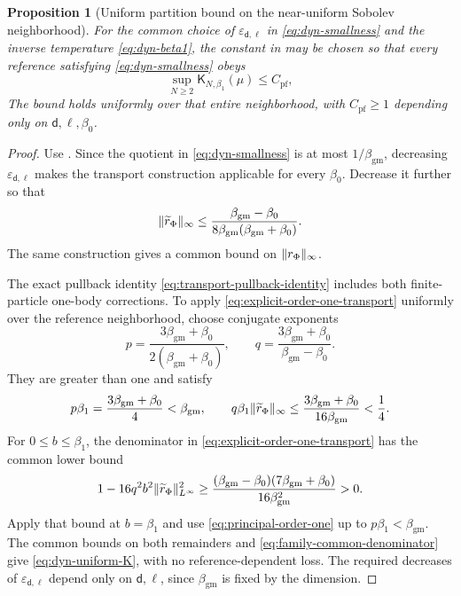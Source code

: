 \documentclass[11pt,reqno]{amsart}
\numberwithin{equation}{section}
\theoremstyle{plain}
\newtheorem{prop}[prop]{Proposition}
\theoremstyle{definition}
\DeclarePairedDelimiter{\norm}{\lVert}{\rVert}
\renewcommand{\d}{\mathsf d}
\newcommand{\be}{\beta}
\newcommand{\vep}{\varepsilon}
\newcommand{\K}{\mathsf K}
\newcommand{\tl}{\widetilde}
\newcommand{\gm}{\mathrm{gm}}
\begin{document}
\begin{prop}[Uniform partition bound on the near-uniform Sobolev neighborhood]
\label{prop:family-uniform-partition}
For the common choice of $\vep_{\d,\ell}$ in \eqref{eq:dyn-smallness} and the inverse temperature \eqref{eq:dyn-beta1}, the constant in  may be chosen so that every reference satisfying \eqref{eq:dyn-smallness} obeys
\begin{equation}
 \sup_{N\geq2}\K_{N,\be_1}(\mu)\leq C_{\mathrm{pf}},
 \label{eq:dyn-uniform-K}
\end{equation}
The bound holds uniformly over that entire neighborhood, with $C_{\mathrm{pf}}\geq1$ depending only on $\d,\ell,\be_0$.
\end{prop}
\begin{proof}
Use . Since the quotient in \eqref{eq:dyn-smallness} is at most $1/\beta_{\gm}$, decreasing $\vep_{\d,\ell}$ makes the transport construction applicable for every $\be_0$. Decrease it further so that
\begin{equation}
 \norm{\tl r_\Phi}_\infty
 \leq\frac{\beta_{\gm}-\be_0}{8\beta_{\gm}(\beta_{\gm}+\be_0)}.
 \label{eq:dyn-r-tube}
\end{equation}
The same construction gives a common bound on $\norm{r_\Phi}_\infty$.

The exact pullback identity \eqref{eq:transport-pullback-identity} includes both finite-particle one-body corrections. To apply \eqref{eq:explicit-order-one-transport} uniformly over the reference neighborhood, choose conjugate exponents
\begin{equation}
 p=\frac{3\beta_{\gm}+\be_0}{2(\beta_{\gm}+\be_0)},\qquad
 q=\frac{3\beta_{\gm}+\be_0}{\beta_{\gm}-\be_0}.
 \label{eq:dyn-pq}
\end{equation}
They are greater than one and satisfy
\begin{equation}
 p\be_1=\frac{3\beta_{\gm}+\be_0}4<\beta_{\gm},\qquad
 q\be_1\norm{\tl r_\Phi}_\infty
 \leq\frac{3\beta_{\gm}+\be_0}{16\beta_{\gm}}<\frac14.
 \label{eq:dyn-common-margin}
\end{equation}
For $0\leq b\leq\be_1$, the denominator in \eqref{eq:explicit-order-one-transport} has the common lower bound
\begin{equation}
 1-16q^2b^2\norm{\tl r_{\Phi}}_{L^\infty}^2
 \geq\frac{(\beta_{\gm}-\be_0)(7\beta_{\gm}+\be_0)}{16\beta_{\gm}^2}>0.
 \label{eq:family-common-denominator}
\end{equation}
Apply that bound at $b=\be_1$ and use \eqref{eq:principal-order-one} up to $p\be_1<\beta_{\gm}$. The common bounds on both remainders and \eqref{eq:family-common-denominator} give \eqref{eq:dyn-uniform-K}, with no reference-dependent loss. The required decreases of $\vep_{\d,\ell}$ depend only on $\d,\ell$, since $\beta_{\gm}$ is fixed by the dimension.
\end{proof}
\end{document}
